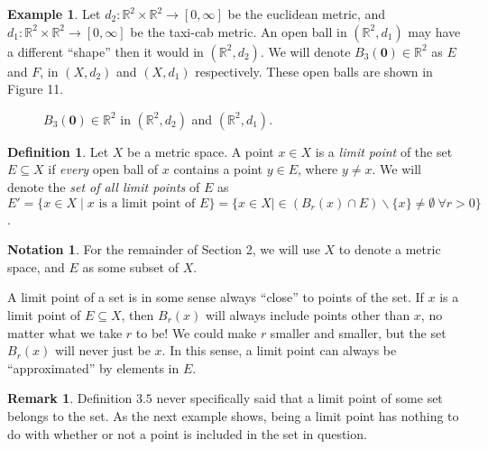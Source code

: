 \documentclass{article}
\newcommand{\R}{\mathbb{R}}
\theoremstyle{definition}
\newtheorem{definition}{Definition}[section]
\newtheorem{note}{Notation}[section]
\newtheorem{example}{Example}[section]
\newtheorem{remark}{Remark}[section]
\begin{document}
	\begin{example}
		Let $ d_{2}:\R^2\times\R^2\to[0,\infty] $ be the euclidean metric, and $ d_{1}:\R^2\times\R^2\to[0,\infty] $ be the taxi-cab metric. An open ball in $ (\R^2, d_{1}) $ may have a different ``shape'' then it would in $ (\R^2, d_{2}) $. We will denote $ B_{3}(\mathbf{0})\in \R^2 $ as $ E $ and $ F $, in $ (X,d_{2}) $ and $ (X,d_{1}) $ respectively. These open balls are shown in Figure 11.     
		\begin{figure}[h!]
			\centering
			\caption{$ B_{3}(\mathbf{0})\in \R^2 $ in $ (\R^2, d_{2}) $ and $ (\R^2, d_{1}) $. }
		\end{figure}	
	\end{example}
	\begin{definition}\label{def2.6}
		Let $ X $ be a metric space. A point $ x\in X $ is a \textit{\color{red}limit point} of the set $ E\subseteq X $ if \textit{every} open ball of $ x $ contains a point $ y\in E $, where $ y\neq x $. We will denote the \textit{\color{red} set of all limit points} of $ E $ as $$ E'=\{x\in X\mid x\text{ is a limit point of }E \}=\{x\in X\mid \in (B_r(x)\cap E)\backslash\{x\}\neq\emptyset\ \forall r>0\} $$.
	\end{definition}
	\begin{note}
		For the remainder of Section 2, we will use $ X $ to denote a metric space, and $ E $ as some subset of $ X $. 
	\end{note}
	A limit point of a set is in some sense always ``close'' to points of the set. If $ x $ is a limit point of $ E\subseteq X $, then $ B_r(x) $ will always include points other than $ x $, no matter what we take $ r $ to be! We could make $ r $ smaller and smaller, but the set $ B_r(x) $ will never just be $ x $. In this sense, a limit point can always be ``approximated'' by elements in $ E $.  
	\begin{remark}
		Definition $ 3.5 $ never specifically said that a limit point of some set belongs to the set. As the next example shows, being a limit point has nothing to do with whether or not a point is included in the set in question. 	
	\end{remark}
\end{document}
